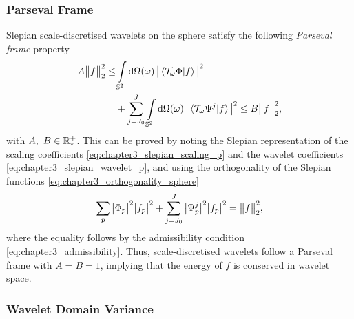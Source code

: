 \subsubsection{Parseval Frame}

Slepian scale-discretised wavelets on the sphere satisfy the following \emph{Parseval frame} property
%
\begin{align}
	A{\big\lVert f\big\rVert}_{2}^{2} \leq
	 & \int\limits_{\mathbb{S}^{2}} \dd{\Omega(\omega)} \big\lvert\braket*{\mathcal{T}_{\omega}\Phi}{f}\big\rvert^{2} \nonumber         \\
	 & + \sum\limits_{j=J_{0}}^{J} \int\limits_{\mathbb{S}^{2}} \dd{\Omega(\omega)} \big\lvert\braket*{\mathcal{T}_{\omega}\Psi^{j}}{f}\big\rvert^{2}
	\leq B{\big\lVert f\big\rVert}_{2}^{2},
\end{align}
%
with \(A,\ B \in \mathbb{R}_{\ast}^{+}{}\).
This can be proved by noting the Slepian representation of the scaling coefficients \cref{eq:chapter3_slepian_scaling_p} and the wavelet coefficients \cref{eq:chapter3_slepian_wavelet_p}, and using the orthogonality of the Slepian functions \cref{eq:chapter3_orthogonality_sphere}
%
\begin{equation}
	\sum\limits_{p} \big\lvert{\Phi}_{p}\big\rvert^{2} \big\lvert{f}_{p}\big\rvert^{2}
	+ \sum\limits_{j=J_{0}}^{J} \big\lvert{\Psi}_{p}^{j}\big\rvert^{2} \big\lvert{f}_{p}\big\rvert^{2}
	= {\big\lVert f\big\rVert}_{2}^{2},
\end{equation}
%
where the equality follows by the admissibility condition \cref{eq:chapter3_admissibility}.
Thus, scale-discretised wavelets follow a Parseval frame with \(A = B = 1\), implying that the energy of \(f\) is conserved in wavelet space.

\subsubsection{Wavelet Domain Variance}

